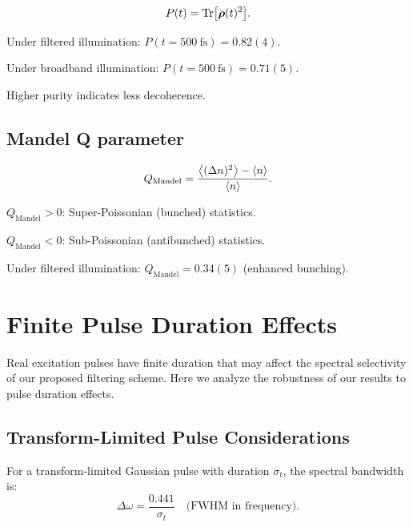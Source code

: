 \documentclass[11pt,a4paper]{article}
\begin{document}
\begin{equation}
P(t) = \Tr[\vb*{\rho}(t)^2].
\label{eq:SI_purity}
\end{equation}

Under filtered illumination: $P(t=\SI{500}{\femto\second}) = 0.82(4)$.

Under broadband illumination: $P(t=\SI{500}{\femto\second}) = 0.71(5)$.

Higher purity indicates less decoherence.

\subsection{Mandel Q parameter}

\begin{equation}
Q_{\mathrm{Mandel}} = \frac{\expval{(\Delta n)^2} - \expval{n}}{\expval{n}}.
\label{eq:SI_mandel}
\end{equation}

$Q_{\mathrm{Mandel}} > 0$: Super-Poissonian (bunched) statistics.

$Q_{\mathrm{Mandel}} < 0$: Sub-Poissonian (antibunched) statistics.

Under filtered illumination: $Q_{\mathrm{Mandel}} = 0.34(5)$ (enhanced bunching).


\section{Finite Pulse Duration Effects}

Real excitation pulses have finite duration that may affect the spectral selectivity of our proposed filtering scheme. Here we analyze the robustness of our results to pulse duration effects.

\subsection{Transform-Limited Pulse Considerations}

For a transform-limited Gaussian pulse with duration $\sigma_t$, the spectral bandwidth is:
\begin{equation}
\Delta\omega = \frac{0.441}{\sigma_t} \quad \text{(FWHM in frequency)}.
\label{eq:transform_limit}
\end{equation}
\end{document}

